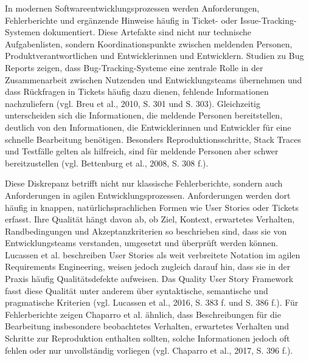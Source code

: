 \documentclass[12pt,a4paper,oneside]{scrreprt}
\begin{document}
In modernen Softwareentwicklungsprozessen werden Anforderungen, Fehlerberichte und ergänzende Hinweise häufig in Ticket- oder Issue-Tracking-Systemen dokumentiert. Diese Artefakte sind nicht nur technische Aufgabenlisten, sondern Koordinationspunkte zwischen meldenden Personen, Produktverantwortlichen und Entwicklerinnen und Entwicklern. Studien zu Bug Reports zeigen, dass Bug-Tracking-Systeme eine zentrale Rolle in der Zusammenarbeit zwischen Nutzenden und Entwicklungsteams übernehmen und dass Rückfragen in Tickets häufig dazu dienen, fehlende Informationen nachzuliefern (vgl. Breu et al., 2010, S. 301 und S. 303). Gleichzeitig unterscheiden sich die Informationen, die meldende Personen bereitstellen, deutlich von den Informationen, die Entwicklerinnen und Entwickler für eine schnelle Bearbeitung benötigen. Besonders Reproduktionsschritte, Stack Traces und Testfälle gelten als hilfreich, sind für meldende Personen aber schwer bereitzustellen (vgl. Bettenburg et al., 2008, S. 308 f.).

Diese Diskrepanz betrifft nicht nur klassische Fehlerberichte, sondern auch Anforderungen in agilen Entwicklungsprozessen. Anforderungen werden dort häufig in knappen, natürlichsprachlichen Formen wie User Stories oder Tickets erfasst. Ihre Qualität hängt davon ab, ob Ziel, Kontext, erwartetes Verhalten, Randbedingungen und Akzeptanzkriterien so beschrieben sind, dass sie von Entwicklungsteams verstanden, umgesetzt und überprüft werden können. Lucassen et al. beschreiben User Stories als weit verbreitete Notation im agilen Requirements Engineering, weisen jedoch zugleich darauf hin, dass sie in der Praxis häufig Qualitätsdefekte aufweisen. Das Quality User Story Framework fasst diese Qualität unter anderem über syntaktische, semantische und pragmatische Kriterien (vgl. Lucassen et al., 2016, S. 383 f. und S. 386 f.). Für Fehlerberichte zeigen Chaparro et al. ähnlich, dass Beschreibungen für die Bearbeitung insbesondere beobachtetes Verhalten, erwartetes Verhalten und Schritte zur Reproduktion enthalten sollten, solche Informationen jedoch oft fehlen oder nur unvollständig vorliegen (vgl. Chaparro et al., 2017, S. 396 f.).
\end{document}
